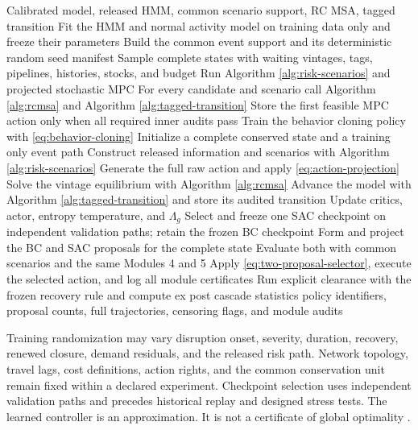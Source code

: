 \documentclass[a4paper,fleqn]{cas-sc}
\begin{document}
\begin{algorithm}[t]
\caption{Integrated model guided constrained policy learning and execution}
\label{alg:mgpcsac}
\begin{algorithmic}[1]
\Require Calibrated model, released HMM, common scenario support, RC MSA, tagged transition
\State Fit the HMM and normal activity model on training data only and freeze their parameters
\State Build the common event support and its deterministic random seed manifest
\State Sample complete states with waiting vintages, tags, pipelines, histories, stocks, and budget
  \State Run Algorithm \ref{alg:risk-scenarios} and projected stochastic MPC
  \State For every candidate and scenario call Algorithm \ref{alg:rcmsa} and Algorithm \ref{alg:tagged-transition}
  \State Store the first feasible MPC action only when all required inner audits pass
\EndFor
\State Train the behavior cloning policy with \cref{eq:behavior-cloning}
  \State Initialize a complete conserved state and a training only event path
    \State Construct released information and scenarios with Algorithm \ref{alg:risk-scenarios}
    \State Generate the full raw action and apply \cref{eq:action-projection}
    \State Solve the vintage equilibrium with Algorithm \ref{alg:rcmsa}
    \State Advance the model with Algorithm \ref{alg:tagged-transition} and store its audited transition
    \State Update critics, actor, entropy temperature, and $\Lambda_g$
  \EndFor
\EndFor
\State Select and freeze one SAC checkpoint on independent validation paths; retain the frozen BC checkpoint
  \State Form and project the BC and SAC proposals for the complete state
  \State Evaluate both with common scenarios and the same Modules 4 and 5
  \State Apply \cref{eq:two-proposal-selector}, execute the selected action, and log all module certificates
\EndFor
\State Run explicit clearance with the frozen recovery rule and compute ex post cascade statistics
\State \Return policy identifiers, proposal counts, full trajectories, censoring flags, and module audits
\end{algorithmic}
\end{algorithm}

Training randomization may vary disruption onset, severity, duration, recovery,
renewed closure, demand residuals, and the released risk path. Network topology,
travel lags, cost definitions, action rights, and the common conservation unit
remain fixed within a declared experiment. Checkpoint selection uses independent
validation paths and precedes historical replay and designed stress tests. The
learned controller is an approximation. It is not a certificate of global
optimality \citep{GijsbrechtsBouteVanMieghemZhang2022}.
\end{document}
